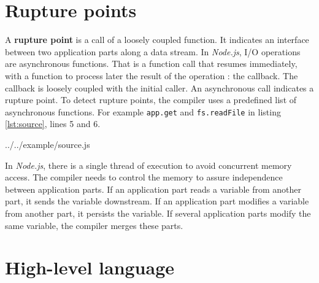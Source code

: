 \section{Rupture points} \label{section:rupture}

A \textbf{rupture point} is a call of a loosely coupled function.
It indicates an interface between two application parts along a data stream.
In \textit{Node.js}, I/O operations are asynchronous functions.
That is a function call that resumes immediately, with a function to process later the result of the operation : the callback.
The callback is loosely coupled with the initial caller.
An asynchronous call indicates a rupture point.
To detect rupture points, the compiler uses a predefined list of asynchronous functions.
For example \texttt{app.get} and \texttt{fs.readFile} in listing \ref{lst:source}, lines 5 and 6.

{../../example/source.js}

In \textit{Node.js}, there is a single thread of execution to avoid concurrent memory access.
The compiler needs to control the memory to assure independence between application parts.
If an application part reads a variable from another part, it sends the variable downstream.
If an application part modifies a variable from another part, it persists the variable.
If several application parts modify the same variable, the compiler merges these parts.

\section{High-level language} \label{section:language}


